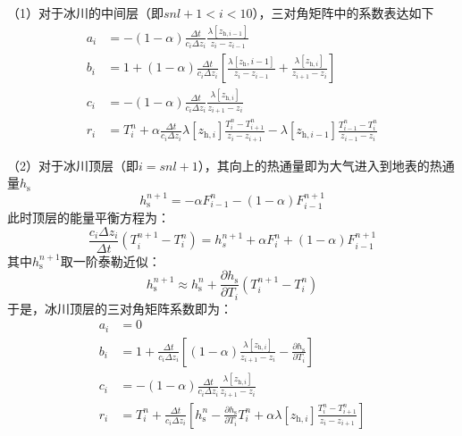 （1）对于冰川的中间层（即$snl+1<i<10$），三对角矩阵中的系数表达如下
\begin{equation}
  \begin{aligned}
    a_i &= -\left(1-\alpha \right) \frac{\Delta t}{c_i \Delta z_i} \frac{\lambda \left[z_{\mathrm{h},i-1}\right]}{z_i-z_{i-1}} \\
    b_i &= 1+\left(1-\alpha \right) \frac{\Delta t}{c_i \Delta z_i} \left[\frac{\lambda \left[z_{\mathrm h},i-1\right]}{z_i-z_{i-1}} + \frac{\lambda \left[z_{\mathrm{h},i}\right]}{z_{i+1}-z_i}\right] \\
    c_i &= -\left(1-\alpha \right)\frac{\Delta t}{c_i\Delta z_i}\frac{\lambda \left[z_{\mathrm{h},i}\right]}{z_{i+1}-z_i} \\
    r_i &= T_{i}^{n}+\alpha \frac{\Delta t}{c_{i} \Delta z_{i}} \lambda\left[z_{\mathrm{h},i}\right] \frac{T_{i}^{n}-T_{i+1}^{n}}{z_{i}-z_{i+1}}-\lambda\left[z_{\mathrm{h},i-1}\right] \frac{T_{i-1}^{n}-T_{i}^{n}}{z_{i-1}-z_{i}}
  \end{aligned}
\end{equation}

（2）对于冰川顶层（即$i=snl+1$），其向上的热通量即为大气进入到地表的热通量$h_{\mathrm {s}} $
\begin{equation}
  h^{n+1}_{\mathrm {s}} =-\alpha F^n_{i-1}-\left(1-\alpha\right)F^{n+1}_{i-1}
\end{equation}
此时顶层的能量平衡方程为：
\begin{equation}
  \frac{c_i\Delta z_i}{\Delta t}\left(T^{n+1}_i-T^n_i\right) = h^{n+1}_s+\alpha F^n_i+\left(1-\alpha \right)F^{n+1}_{i-1}
\end{equation}
其中$h^{n+1}_{\mathrm {s}} $取一阶泰勒近似：
\begin{equation}
  h^{n+1}_{\mathrm {s}}  \approx h^n_{\mathrm {s}}  + \frac{\partial h_{\mathrm {s}} }{\partial T_i}\left(T^{n+1}_i-T^n_i\right)
\end{equation}
于是，冰川顶层的三对角矩阵系数即为：
\begin{equation}
  \begin{aligned}
    a_{i} &= 0 \\
    b_{i} &= 1+\frac{\Delta t}{c_{i} \Delta z_{i}}\left[(1-\alpha) \frac{\lambda\left[z_{\mathrm{h},i}\right]}{z_{i+1}-z_{i}}-\frac{\partial h_{\mathrm{s}}}{\partial T_{i}}\right] \\
    c_{i} &= -(1-\alpha) \frac{\Delta t}{c_{i} \Delta z_{i}} \frac{\lambda\left[z_{\mathrm{h},i}\right]}{z_{i+1}-z_{i}} \\
    r_{i} &= T_{i}^{n}+\frac{\Delta t}{c_{i} \Delta z_{i}}\left[h_{\mathrm{s}}^{n}-\frac{\partial h_{\mathrm{s}}}{\partial T_{i}} T_{i}^{n}+\alpha \lambda\left[z_{\mathrm{h},i}\right] \frac{T_{i}^{n}-T_{i+1}^{n}}{z_{i}-z_{i+1}}\right]
  \end{aligned}
\end{equation}

